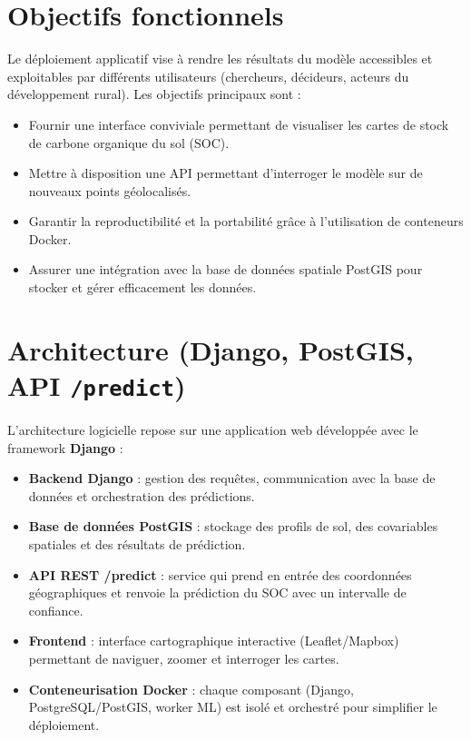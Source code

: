 \documentclass[12pt,a4paper,oneside]{report}
\begin{document}
\section{Objectifs fonctionnels}
Le déploiement applicatif vise à rendre les résultats du modèle accessibles et exploitables par différents utilisateurs (chercheurs, décideurs, acteurs du développement rural). Les objectifs principaux sont :
\begin{itemize}
  \item Fournir une interface conviviale permettant de visualiser les cartes de stock de carbone organique du sol (SOC).
  \item Mettre à disposition une API permettant d’interroger le modèle sur de nouveaux points géolocalisés.
  \item Garantir la reproductibilité et la portabilité grâce à l’utilisation de conteneurs Docker.
  \item Assurer une intégration avec la base de données spatiale PostGIS pour stocker et gérer efficacement les données.
\end{itemize}

\section{Architecture (Django, PostGIS, API \texttt{/predict})}
L’architecture logicielle repose sur une application web développée avec le framework \textbf{Django} :
\begin{itemize}
  \item \textbf{Backend Django} : gestion des requêtes, communication avec la base de données et orchestration des prédictions.
  \item \textbf{Base de données PostGIS} : stockage des profils de sol, des covariables spatiales et des résultats de prédiction.
  \item \textbf{API REST /predict} : service qui prend en entrée des coordonnées géographiques et renvoie la prédiction du SOC avec un intervalle de confiance.
  \item \textbf{Frontend} : interface cartographique interactive (Leaflet/Mapbox) permettant de naviguer, zoomer et interroger les cartes.
  \item \textbf{Conteneurisation Docker} : chaque composant (Django, PostgreSQL/PostGIS, worker ML) est isolé et orchestré pour simplifier le déploiement.
\end{itemize}

\end{document}
